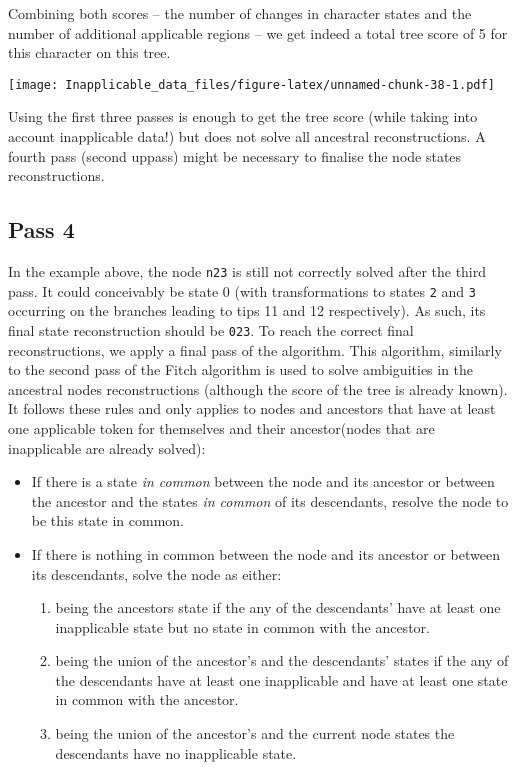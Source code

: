 \documentclass[]{book}
\providecommand{\tightlist}{%
  \setlength{\itemsep}{0pt}\setlength{\parskip}{0pt}}
\theoremstyle{definition}
\theoremstyle{definition}
\theoremstyle{definition}
\theoremstyle{remark}
\begin{document}
Combining both scores -- the number of changes in character states and
the number of additional applicable regions -- we get indeed a total
tree score of 5 for this character on this tree.

\texttt{[image: Inapplicable\_data\_files/figure-latex/unnamed-chunk-38-1.pdf]}

Using the first three passes is enough to get the tree score (while
taking into account inapplicable data!) but does not solve all ancestral
reconstructions. A fourth pass (second uppass) might be necessary to
finalise the node states reconstructions.

\subsection{Pass 4}\label{pass-4}

In the example above, the node \texttt{n23} is still not correctly
solved after the third pass. It could conceivably be state 0 (with
transformations to states \texttt{2} and \texttt{3} occurring on the
branches leading to tips 11 and 12 respectively). As such, its final
state reconstruction should be \texttt{023}. To reach the correct final
reconstructions, we apply a final pass of the algorithm. This algorithm,
similarly to the second pass of the Fitch algorithm is used to solve
ambiguities in the ancestral nodes reconstructions (although the score
of the tree is already known). It follows these rules and only applies
to nodes and ancestors that have at least one applicable token for
themselves and their ancestor(nodes that are inapplicable are already
solved):

\begin{itemize}
\tightlist
\item
  If there is a state \emph{in common} between the node and its ancestor
  or between the ancestor and the states \emph{in common} of its
  descendants, resolve the node to be this state in common.
\item
  If there is nothing in common between the node and its ancestor or
  between its descendants, solve the node as either:

  \begin{enumerate}
  \def\labelenumi{\arabic{enumi}.}
  \tightlist
  \item
    being the ancestors state if the any of the descendants' have at
    least one inapplicable state but no state in common with the
    ancestor.
  \item
    being the union of the ancestor's and the descendants' states if the
    any of the descendants have at least one inapplicable and have at
    least one state in common with the ancestor.
  \item
    being the union of the ancestor's and the current node states the
    descendants have no inapplicable state.
  \end{enumerate}
\end{itemize}
\end{document}
